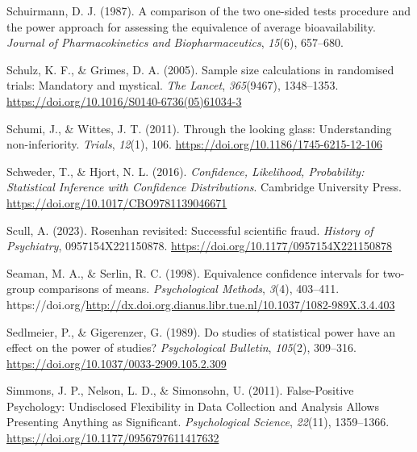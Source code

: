 \documentclass[
  letterpaper,
  DIV=11,
  numbers=noendperiod]{scrreprt}
\newlength{\cslhangindent}
\newlength{\cslentryspacingunit} %
\newenvironment{CSLReferences}[2] %
 {%
  \setlength{\parindent}{0pt}
  \ifodd #1
  \let\oldpar\par
  \def\par{\hangindent=\cslhangindent\oldpar}
  \fi
  \setlength{\parskip}{#2\cslentryspacingunit}
 }%
 {}
\begin{document}
\begin{CSLReferences}{1}{0}
\leavevmode{}%
Schuirmann, D. J. (1987). A comparison of the two one-sided tests
procedure and the power approach for assessing the equivalence of
average bioavailability. \emph{Journal of Pharmacokinetics and
Biopharmaceutics}, \emph{15}(6), 657--680.

\leavevmode{}%
Schulz, K. F., \& Grimes, D. A. (2005). Sample size calculations in
randomised trials: Mandatory and mystical. \emph{The Lancet},
\emph{365}(9467), 1348--1353.
\url{https://doi.org/10.1016/S0140-6736(05)61034-3}

\leavevmode{}%
Schumi, J., \& Wittes, J. T. (2011). Through the looking glass:
Understanding non-inferiority. \emph{Trials}, \emph{12}(1), 106.
\url{https://doi.org/10.1186/1745-6215-12-106}

\leavevmode{}%
Schweder, T., \& Hjort, N. L. (2016). \emph{Confidence, {Likelihood},
{Probability}: {Statistical Inference} with {Confidence Distributions}}.
{Cambridge University Press}.
\url{https://doi.org/10.1017/CBO9781139046671}

\leavevmode{}%
Scull, A. (2023). Rosenhan revisited: Successful scientific fraud.
\emph{History of Psychiatry}, 0957154X221150878.
\url{https://doi.org/10.1177/0957154X221150878}

\leavevmode{}%
Seaman, M. A., \& Serlin, R. C. (1998). Equivalence confidence intervals
for two-group comparisons of means. \emph{Psychological Methods},
\emph{3}(4), 403--411.
https://doi.org/\url{http://dx.doi.org.dianus.libr.tue.nl/10.1037/1082-989X.3.4.403}

\leavevmode{}%
Sedlmeier, P., \& Gigerenzer, G. (1989). Do studies of statistical power
have an effect on the power of studies? \emph{Psychological Bulletin},
\emph{105}(2), 309--316.
\url{https://doi.org/10.1037/0033-2909.105.2.309}

\leavevmode{}%
Simmons, J. P., Nelson, L. D., \& Simonsohn, U. (2011). False-{Positive
Psychology}: {Undisclosed Flexibility} in {Data Collection} and
{Analysis Allows Presenting Anything} as {Significant}.
\emph{Psychological Science}, \emph{22}(11), 1359--1366.
\url{https://doi.org/10.1177/0956797611417632}


\end{CSLReferences}
\end{document}
